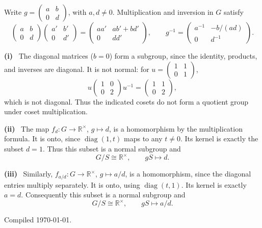 \documentclass[11pt]{article}
\newcommand{\partlabel}[1]{\par\textbf{(#1)}\ }
\newcommand{\R}{\mathbb R}
\begin{document}
\begin{solution}
Write $g=\begin{pmatrix}a&b\\0&d\end{pmatrix}$, with $a,d\ne0$. Multiplication and inversion in $G$ satisfy
\[
 \begin{pmatrix}a&b\\0&d\end{pmatrix}
 \begin{pmatrix}a'&b'\\0&d'\end{pmatrix}
 =\begin{pmatrix}aa'&ab'+bd'\\0&dd'\end{pmatrix},
 \qquad
 g^{-1}=\begin{pmatrix}a^{-1}&-b/(ad)\\0&d^{-1}\end{pmatrix}.
\]
\partlabel{i} The diagonal matrices ($b=0$) form a subgroup, since the identity, products, and inverses are diagonal. It is not normal: for $u=\begin{pmatrix}1&1\\0&1\end{pmatrix}$,
\[
 u\begin{pmatrix}1&0\\0&2\end{pmatrix}u^{-1}
 =\begin{pmatrix}1&1\\0&2\end{pmatrix},
\]
which is not diagonal. Thus the indicated cosets do not form a quotient group under coset multiplication.
\partlabel{ii} The map $f_d:G\to\R^\times$, $g\mapsto d$, is a homomorphism by the multiplication formula. It is onto, since $\operatorname{diag}(1,t)$ maps to any $t\ne0$. Its kernel is exactly the subset $d=1$. Thus this subset is a normal subgroup and
\[
 \boxed{G/S\cong\R^\times,\qquad gS\longmapsto d.}
\]
\partlabel{iii} Similarly, $f_{a/d}:G\to\R^\times$, $g\mapsto a/d$, is a homomorphism, since the diagonal entries multiply separately. It is onto, using $\operatorname{diag}(t,1)$. Its kernel is exactly $a=d$. Consequently this subset is a normal subgroup and
\[
 \boxed{G/S\cong\R^\times,\qquad gS\longmapsto a/d.}
\]
\end{solution}

\vfill
{\small\color{darkgray}Compiled \today.}
\end{document}
